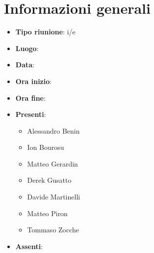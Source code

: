 \section{Informazioni generali}
\begin{itemize}
  \item \textbf{Tipo riunione}: i/e
  \item \textbf{Luogo}: 
  \item \textbf{Data}: 
  \item \textbf{Ora inizio}: 
  \item \textbf{Ora fine}: 
  
  \item \textbf{Presenti}:
  \begin{itemize}
    \item Alessandro Benin
    \item Ion Bourosu
    \item Matteo Gerardin
    \item Derek Gusatto
    \item Davide Martinelli
    \item Matteo Piron
    \item Tommaso Zocche
  \end{itemize}

  \item \textbf{Assenti}:
 
\end{itemize}